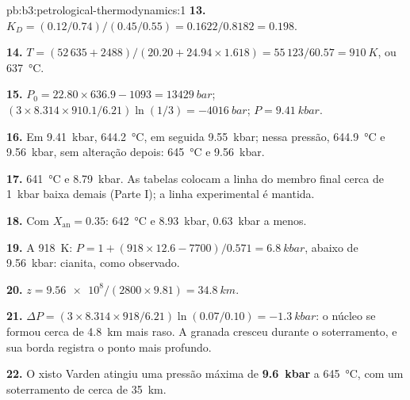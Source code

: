 \begin{solution}{pb:b3:petrological-thermodynamics:1}
\textbf{13.} $K_D = (0.12/0.74)/(0.45/0.55) = 0.1622/0.8182 = 0.198$.

\textbf{14.} $T = (52\,635 + 2488)/(20.20 + 24.94\times1.618) = 55\,123/60.57
= \qty{910}{K}$, ou \qty{637}{\celsius}.

\textbf{15.} $P_0 = 22.80\times636.9 - 1093 = \qty{13429}{bar}$; $(3\times8.314
\times910.1/6.21)\ln(1/3) = \qty{-4016}{bar}$; $P = \qty{9.41}{kbar}$.

\textbf{16.} Em \qty{9.41}{kbar}, \qty{644.2}{\celsius}, em seguida
\qty{9.55}{kbar}; nessa pressão, \qty{644.9}{\celsius} e
\qty{9.56}{kbar}, sem alteração depois: \qty{645}{\celsius} e
\qty{9.56}{kbar}.

\textbf{17.} \qty{641}{\celsius} e \qty{8.79}{kbar}. As tabelas colocam a
linha do membro final cerca de \qty{1}{kbar} baixa demais (Parte I); a linha experimental
é mantida.

\textbf{18.} Com $X_{\text{an}} = 0.35$: \qty{642}{\celsius} e
\qty{8.93}{kbar}, \qty{0.63}{kbar} a menos.

\textbf{19.} A \qty{918}{K}: $P = 1 + (918\times12.6 - 7700)/0.571 =
\qty{6.8}{kbar}$, abaixo de \qty{9.56}{kbar}: cianita, como observado.

\textbf{20.} $z = \num{9.56e8}/(2800\times9.81) = \qty{34.8}{km}$.

\textbf{21.} $\Delta P = (3\times8.314\times918/6.21)\ln(0.07/0.10) =
\qty{-1.3}{kbar}$: o núcleo se formou cerca de \qty{4.8}{km} mais raso. A granada
cresceu durante o soterramento, e sua borda registra o ponto mais profundo.

\textbf{22.} O xisto Varden atingiu uma pressão máxima de
\textbf{\qty[text-series-to-math=true]{9.6}{kbar}} a
\qty{645}{\celsius}, com um soterramento de cerca de \qty{35}{km}.
\end{solution}
